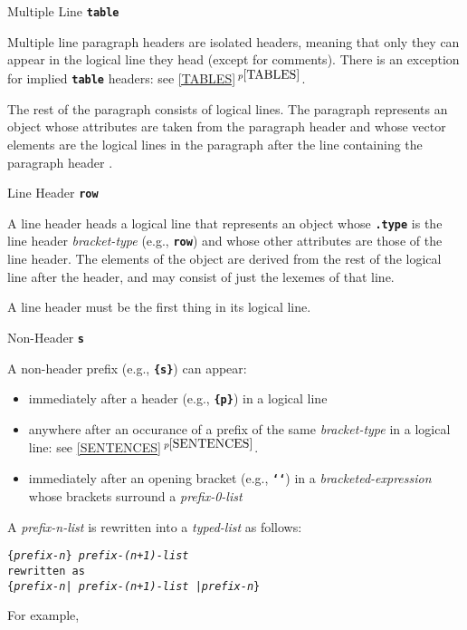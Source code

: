\documentclass[12pt]{article}
\newcommand{\TT}[1]{{\tt \bfseries #1}}
\newcommand{\itemref}[1]{\ref{#1}$\,^{p\pageref{#1}}$}
\newenvironment{indpar}[1][0.3in]%
	{\begin{list}{}%
		     {\setlength{\itemsep}{0in}%
		      \setlength{\topsep}{0in}%
		      \setlength{\parsep}{1ex}%
		      \setlength{\labelwidth}{#1}%
		      \setlength{\leftmargin}{#1}%
		      \addtolength{\leftmargin}{\labelsep}}%
	 \item}%
	{\end{list}}
\begin{document}
\begin{indpar}[1em]
\begin{indpar}[1em]
Multiple Line \hfill \TT{table}
\begin{indpar}[1em]
Multiple line paragraph headers
are isolated headers, meaning that only they can appear in the
logical line they head (except for comments).
There is an exception for implied \TT{table} headers: see \itemref{TABLES}.

The rest of the paragraph consists of logical lines.  The paragraph
represents an object whose attributes are taken from the paragraph header
and whose vector elements are the logical lines in the paragraph after
the line containing the paragraph header .
\end{indpar}
\end{indpar}
Line Header \hfill \TT{row}
\begin{indpar}[1em]
A line header heads a logical line that represents an object
whose \TT{.type} is the line header {\em bracket-type} (e.g., \TT{row})
and whose other attributes are those of the line header.
The elements of the object are derived from the rest of the
logical line after the header, and may consist of just the
lexemes of that line.

A line header must be the first thing in its logical line.
\end{indpar}
Non-Header \hfill \TT{s}
\begin{indpar}[1em]
A non-header prefix (e.g., \TT{\{s\}}) can appear:
\raggedright
\begin{itemize}
\item immediately after a header (e.g., \TT{\{p\}}) in a logical line
\item anywhere after an occurance of a prefix of the same {\em bracket-type}
in a logical line: see \itemref{SENTENCES}.
\item immediately after an opening bracket (e.g., \TT{`{}`})
in a {\em bracketed-expression} whose brackets surround a {\em prefix-0-list}
\end{itemize}
\end{indpar}
\end{indpar}

A {\em prefix-n-list} is rewritten into a {\em typed-list} as follows:
\begin{center}
\tt \{{\em prefix-n}\} {\em prefix-(n+1)-list} \\
\rm rewritten as \\
\tt \{{\em prefix-n}| {\em prefix-(n+1)-list} |{\em prefix-n}\}
\end{center}

For example,
\end{document}
